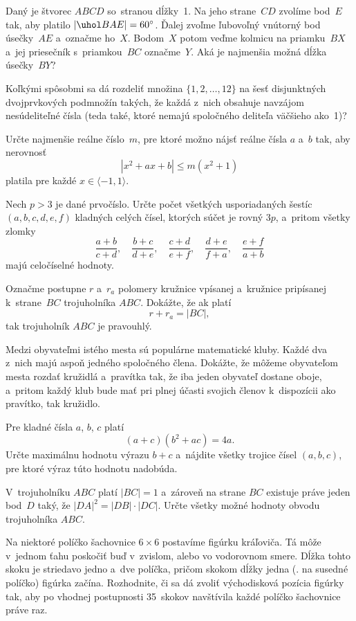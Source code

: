 {%
Daný je štvorec $ABCD$ so~stranou dĺžky~1. Na jeho strane~$CD$ zvolíme bod~$E$ tak, aby platilo $|\uhol BAE| = 60^\circ$. Ďalej
zvoľme ľubovoľný vnútorný bod úsečky~$AE$ a~označme ho~$X$. Bodom~$X$ potom veďme kolmicu na priamku~$BX$ a~jej priesečník s~priamkou~$BC$ označme~$Y$. Aká je najmenšia možná dĺžka úsečky~$BY$?}

{%
Koľkými spôsobmi sa dá rozdeliť množina $\{1,2,\ldots,12\}$ na
šesť disjunktných dvojprvkových podmnožín takých, že každá
z~nich obsahuje navzájom nesúdeliteľné čísla (teda také, ktoré nemajú
spoločného deliteľa väčšieho ako~1)?}

{%
Určte najmenšie reálne číslo~$m$, pre ktoré možno nájsť reálne čísla
$a$ a~$b$ tak, aby nerovnosť
$$
|x^2+ax+b|\le m(x^2+1)
$$
platila pre každé $x\in\langle-1,1\rangle$.}

{%
Nech $p>3$ je dané prvočíslo. Určte počet všetkých
usporiadaných šestíc $(a,b,c,d,e,f)$ kladných celých čísel, ktorých
súčet je rovný $3p$, a~pritom všetky zlomky
$$
\frac{a+b}{c+d}, \quad \frac{b+c}{d+e}, \quad \frac{c+d}{e+f},
\quad \frac{d+e}{f+a}, \quad \frac{e+f}{a+b}
$$
majú celočíselné hodnoty.
}

{%
Označme postupne $r$ a~$r_a$ polomery kružnice vpísanej
a~kružnice pripísanej k~strane~$BC$ trojuholníka $ABC$. Dokážte,
že ak platí
$$
r+r_a= |BC|,
$$
tak trojuholník $ABC$ je pravouhlý.}

{%
Medzi obyvateľmi istého mesta sú populárne matematické
kluby. Každé dva z~nich majú aspoň jedného spoločného
člena. Dokážte, že môžeme obyvateľom mesta rozdať kružidlá
a~pravítka tak, že iba jeden obyvateľ dostane oboje, a~pritom každý
klub bude mať pri plnej účasti svojich členov k~dispozícii ako
pravítko, tak kružidlo.}

{%
Pre kladné čísla $a$, $b$, $c$ platí
$$
(a+c)(b^2+ac) = 4a.
$$
Určte maximálnu hodnotu výrazu $b+c$ a~nájdite všetky trojice
čísel $(a,b,c)$, pre ktoré výraz túto hodnotu nadobúda.}

{%
V~trojuholníku $ABC$ platí $|BC|=1$ a~zároveň na strane
$BC$ existuje práve jeden bod~$D$ taký, že $|DA|^2 = |DB| \cdot
|DC|$. Určte všetky možné hodnoty obvodu trojuholníka $ABC$.}

{%
Na niektoré políčko šachovnice $6\times 6$ postavíme figúrku
kráľoviča. Tá môže v~jednom ťahu poskočiť buď v~zvislom, alebo
vo vodorovnom smere. Dĺžka tohto skoku je striedavo jedno a~dve políčka, pričom skokom dĺžky jedna (\tj. na susedné políčko) figúrka začína.
Rozhodnite, či sa dá zvoliť východisková pozícia figúrky tak, aby po
vhodnej postupnosti 35~skokov navštívila každé políčko šachovnice
práve raz.}

